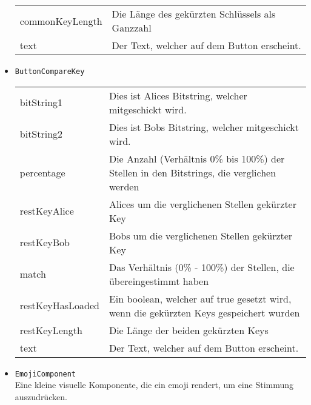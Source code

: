 \begin{itemize}
\begin{tabularx}{\textwidth}{p{4.5cm}p{9.5cm}}
commonKeyLength &  Die Länge des gekürzten Schlüssels als Ganzzahl \\
text &  Der Text, welcher auf dem Button erscheint.
\end{tabularx}
\item \texttt{ButtonCompareKey} \\
\begin{tabularx}{\textwidth}{p{4.5cm}p{9.5cm}} \\
bitString1 &  Dies ist Alices Bitstring, welcher mitgeschickt wird. \\
bitString2 &  Dies ist Bobs Bitstring, welcher mitgeschickt wird. \\
percentage &  Die Anzahl (Verhältnis 0\% bis 100\%) der Stellen in den Bitstrings, die verglichen werden \\
restKeyAlice &  Alices um die verglichenen Stellen gekürzter Key \\
restKeyBob &  Bobs um die verglichenen Stellen gekürzter Key \\
match & Das Verhältnis (0\% - 100\%) der Stellen, die übereingestimmt haben \\
restKeyHasLoaded &  Ein boolean, welcher auf true gesetzt wird, wenn die gekürzten Keys gespeichert wurden \\
restKeyLength &  Die Länge der beiden gekürzten Keys \\
text & Der Text, welcher auf dem Button erscheint.
\end{tabularx}
\item \texttt{EmojiComponent} \\
Eine kleine visuelle Komponente, die ein emoji rendert, um eine Stimmung auszudrücken.
\end{itemize}


